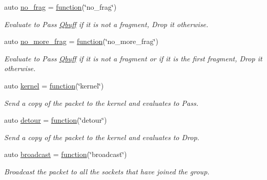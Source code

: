 \begin{DoxyCompactItemize}
auto \hyperlink{namespacepfq_1_1lang_1_1anonymous__namespace_02default_8hpp_03_a4cfaf018f687a1563161b8f4245a6652}{no\+\_\+frag} = \hyperlink{namespacepfq_1_1lang_a1a4638059d700ae08d0ca63886ff2bb3}{function}(\char`\"{}no\+\_\+frag\char`\"{})
\begin{DoxyCompactList}\small\item\em Evaluate to {\ttfamily Pass} \hyperlink{structpfq_1_1lang_1_1Qbuff}{Qbuff} if it is not a fragment, {\ttfamily Drop} it otherwise. \end{DoxyCompactList}\item 
auto \hyperlink{namespacepfq_1_1lang_1_1anonymous__namespace_02default_8hpp_03_a88628ce70e2a650af1338851373b9891}{no\+\_\+more\+\_\+frag} = \hyperlink{namespacepfq_1_1lang_a1a4638059d700ae08d0ca63886ff2bb3}{function}(\char`\"{}no\+\_\+more\+\_\+frag\char`\"{})
\begin{DoxyCompactList}\small\item\em Evaluate to {\ttfamily Pass} \hyperlink{structpfq_1_1lang_1_1Qbuff}{Qbuff} if it is not a fragment or if it is the first fragment, {\ttfamily Drop} it otherwise. \end{DoxyCompactList}\item 
auto \hyperlink{namespacepfq_1_1lang_1_1anonymous__namespace_02default_8hpp_03_a93294225145f96c6aa6cf0cedfa19103}{kernel} = \hyperlink{namespacepfq_1_1lang_a1a4638059d700ae08d0ca63886ff2bb3}{function}(\char`\"{}kernel\char`\"{})
\begin{DoxyCompactList}\small\item\em Send a copy of the packet to the kernel and evaluates to {\ttfamily Pass}. \end{DoxyCompactList}\item 
auto \hyperlink{namespacepfq_1_1lang_1_1anonymous__namespace_02default_8hpp_03_ac8ba4f5ff06c1e099ac888ba4faa697a}{detour} = \hyperlink{namespacepfq_1_1lang_a1a4638059d700ae08d0ca63886ff2bb3}{function}(\char`\"{}detour\char`\"{})
\begin{DoxyCompactList}\small\item\em Send a copy of the packet to the kernel and evaluates to {\ttfamily Drop}. \end{DoxyCompactList}\item 
auto \hyperlink{namespacepfq_1_1lang_1_1anonymous__namespace_02default_8hpp_03_ac9e0f3ad7fa32146565f4aaab709d19d}{broadcast} = \hyperlink{namespacepfq_1_1lang_a1a4638059d700ae08d0ca63886ff2bb3}{function}(\char`\"{}broadcast\char`\"{})
\begin{DoxyCompactList}\small\item\em Broadcast the packet to all the sockets that have joined the group. \end{DoxyCompactList}\item 

\end{DoxyCompactItemize}
